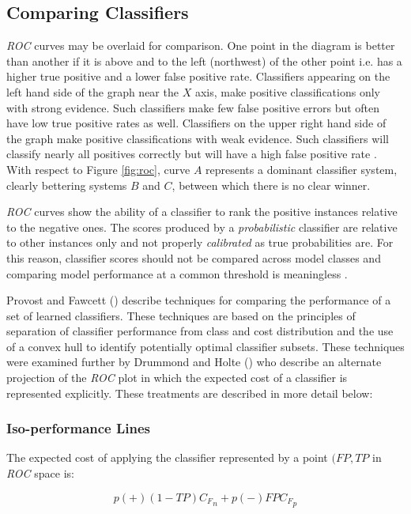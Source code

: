 \documentclass[10pt]{unbthesis}
\begin{document}
\subsection{Comparing Classifiers}
\textit{ROC} curves may be overlaid for comparison. One
point in the diagram is better than another if it is above and to the
left (northwest)
of the other point i.e. has a higher true positive and a lower false positive
rate. Classifiers appearing on the left hand side of the graph near
the \(X\) axis, make positive
classifications only with strong evidence. Such classifiers make few
false positive errors but often have low true positive rates as
well. Classifiers on the upper right hand side of the graph make
positive classifications with weak evidence. Such classifiers will
classify nearly all positives correctly but will have a high false
positive rate \cite{RefWorks:39}. With respect to Figure \ref{fig:roc},
curve \(A\) represents a dominant classifier system, clearly bettering
systems \(B\) and \(C\), between which there is no clear winner. 

\textit{ROC} curves show the ability of a classifier to rank the
positive instances relative to the negative ones. The scores produced
by a \textit{probabilistic} classifier are relative to other instances
only and not properly \textit{calibrated} as true probabilities
are. For this reason, classifier scores should not be compared across
model classes and comparing model performance at a common threshold is
meaningless \cite{RefWorks:39}. 

Provost and Fawcett (\cite{RefWorks:61}) describe techniques for
comparing the performance of a set of learned classifiers. These
techniques are based on the principles of separation of classifier
performance from class and cost distribution and the use of a convex
hull to identify potentially optimal classifier subsets. These
techniques were examined further by Drummond and Holte
(\cite{RefWorks:52}) who describe an alternate projection of the
\textit{ROC} plot in which the expected cost of a classifier is
represented explicitly. These treatments are described in more detail
below: 


\subsubsection{Iso-performance Lines}
The expected cost of applying the classifier represented by a point
\((FP, TP\) in \textit{ROC} space  is:

\begin{equation}
\label{equ:expectedcost}
p(+)(1-TP){C_F}_n + p(-)FP{C_F}_p
\end{equation}
\end{document}
